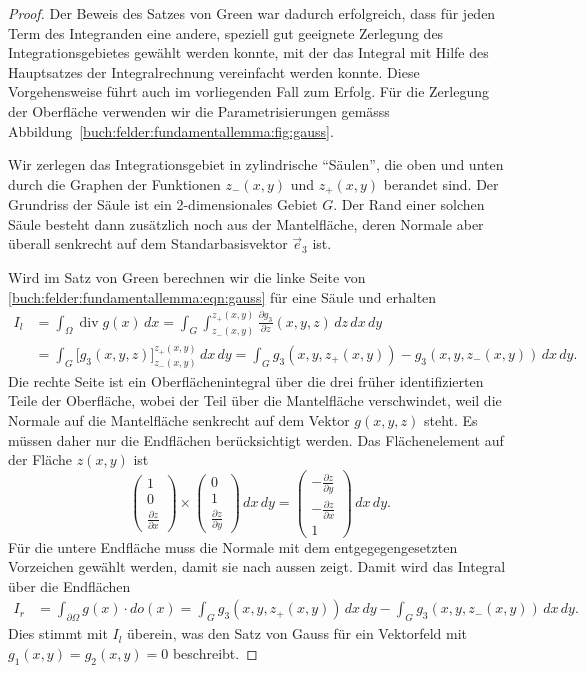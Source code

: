 \begin{proof}
Der Beweis des Satzes von Green war dadurch erfolgreich, dass für jeden
Term des Integranden eine andere, speziell gut geeignete Zerlegung
des Integrationsgebietes gewählt werden konnte, mit der das Integral
mit Hilfe des Hauptsatzes der Integralrechnung vereinfacht werden konnte.
Diese Vorgehensweise führt auch im vorliegenden Fall zum Erfolg.
Für die Zerlegung der Oberfläche verwenden wir die Parametrisierungen
gemässs Abbildung~\ref{buch:felder:fundamentallemma:fig:gauss}.

Wir zerlegen das Integrationsgebiet in zylindrische ``Säulen'', die
oben und unten durch die Graphen der Funktionen $z_-(x,y)$ und $z_+(x,y)$ 
berandet sind.
Der Grundriss der Säule ist ein 2-dimensionales Gebiet $G$.
Der Rand einer solchen Säule besteht dann zusätzlich noch aus der
Mantelfläche, deren Normale aber überall senkrecht auf dem Standarbasisvektor
$\vec{e}_3$ ist.

Wird im Satz von Green berechnen wir die linke Seite von
\eqref{buch:felder:fundamentallemma:eqn:gauss} für eine Säule und erhalten
\begin{align*}
I_l
&=
\int_\Omega \operatorname{div}g(x)\,dx
=
\int_{G}\int_{z_-(x,y)}^{z_+(x,y)}
\frac{\partial g_3}{\partial z}(x,y,z)
\,dz\,dx\,dy
\\
&=
\int_G \biggl[ g_3(x,y,z)\biggr]_{z_-(x,y)}^{z_+(x,y)}\,dx\,dy
=
\int_G g_3(x,y,z_+(x,y)) - g_3(x,y,z_-(x,y)) \,dx\,dy.
\end{align*}
Die rechte Seite ist ein Oberflächenintegral über die drei früher
identifizierten Teile der Oberfläche, wobei der Teil über die Mantelfläche
verschwindet, weil die Normale auf die Mantelfläche senkrecht auf dem
Vektor $g(x,y,z)$ steht.
Es müssen daher nur die Endflächen berücksichtigt werden.
Das Flächenelement auf der Fläche $z(x,y)$ ist 
\[
\renewcommand{\arraystretch}{1.8}
\begin{pmatrix}
1\\
0\\
\displaystyle
\frac{\partial z}{\partial x}
\end{pmatrix}
\times
\begin{pmatrix}
0\\
1\\
\displaystyle
\frac{\partial z}{\partial y}
\end{pmatrix}
\,dx\,dy
=
\begin{pmatrix}
\displaystyle
-\frac{\partial z}{\partial y}\\
\displaystyle
-\frac{\partial z}{\partial x}\\
1
\end{pmatrix}
\,dx\,dy.
\]
Für die untere Endfläche muss die Normale mit dem entgegegengesetzten 
Vorzeichen gewählt werden, damit sie nach aussen zeigt.
Damit wird das Integral über die Endflächen
\begin{align*}
I_r
&=
\int_{\partial\Omega} g(x) \cdot do(x)
=
\int_{G} g_3(x,y,z_+(x,y)) \,dx\,dy
-
\int_{G} g_3(x,y,z_-(x,y)) \,dx\,dy.
\end{align*}
Dies stimmt mit $I_l$ überein, was den Satz von Gauss für ein
Vektorfeld mit $g_1(x,y)=g_2(x,y)=0$ beschreibt.


\end{proof}
